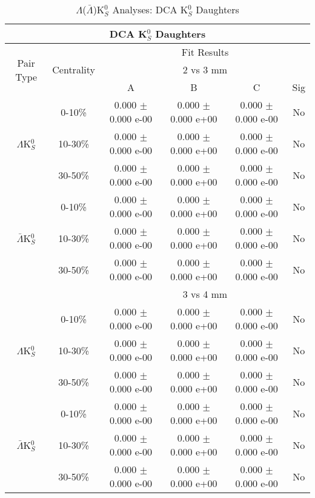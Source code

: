 \documentclass[../AnalysisNoteJBuxton.tex]{subfiles}
\begin{document}
\begin{table}
 \centering
 \begin{tabular}{|c|c|c|c|c|c|}
  \multicolumn{6}{c}{DCA K$^{0}_{S}$ Daughters} \\
  \hline
  \multirow{3}{*}{Pair Type} & \multirow{3}{*}{Centrality} & \multicolumn{4}{c|}{Fit Results} \\
  \cline{3-6}
   & & \multicolumn{4}{c|}{2 vs 3 mm} \\
  \cline{3-6}
   & & A & B & C & Sig \\
  \hline  
  \multirow{3}{*}{$\Lambda$K$^{0}_{S}$}
   &  0-10\% & 0.000 $\pm$ 0.000 e-00 & 0.000 $\pm$ 0.000 e+00 & 0.000 $\pm$ 0.000 e-00 & No \\
   & 10-30\% & 0.000 $\pm$ 0.000 e-00 & 0.000 $\pm$ 0.000 e+00 & 0.000 $\pm$ 0.000 e-00 & No \\
   & 30-50\% & 0.000 $\pm$ 0.000 e-00 & 0.000 $\pm$ 0.000 e+00 & 0.000 $\pm$ 0.000 e-00 & No \\
  \hline
  \multirow{3}{*}{$\bar{\Lambda}$K$^{0}_{S}$}  
   &  0-10\% & 0.000 $\pm$ 0.000 e-00 & 0.000 $\pm$ 0.000 e+00 & 0.000 $\pm$ 0.000 e-00 & No \\
   & 10-30\% & 0.000 $\pm$ 0.000 e-00 & 0.000 $\pm$ 0.000 e+00 & 0.000 $\pm$ 0.000 e-00 & No \\
   & 30-50\% & 0.000 $\pm$ 0.000 e-00 & 0.000 $\pm$ 0.000 e+00 & 0.000 $\pm$ 0.000 e-00 & No \\
  \hline 
  \multicolumn{2}{|c|}{} & \multicolumn{4}{c|}{3 vs 4 mm} \\
  \hline  
  \multirow{3}{*}{$\Lambda$K$^{0}_{S}$}   
   &  0-10\% & 0.000 $\pm$ 0.000 e-00 & 0.000 $\pm$ 0.000 e+00 & 0.000 $\pm$ 0.000 e-00 & No \\
   & 10-30\% & 0.000 $\pm$ 0.000 e-00 & 0.000 $\pm$ 0.000 e+00 & 0.000 $\pm$ 0.000 e-00 & No \\
   & 30-50\% & 0.000 $\pm$ 0.000 e-00 & 0.000 $\pm$ 0.000 e+00 & 0.000 $\pm$ 0.000 e-00 & No \\
  \hline  
  \multirow{3}{*}{$\bar{\Lambda}$K$^{0}_{S}$}
   &  0-10\% & 0.000 $\pm$ 0.000 e-00 & 0.000 $\pm$ 0.000 e+00 & 0.000 $\pm$ 0.000 e-00 & No \\
   & 10-30\% & 0.000 $\pm$ 0.000 e-00 & 0.000 $\pm$ 0.000 e+00 & 0.000 $\pm$ 0.000 e-00 & No \\
   & 30-50\% & 0.000 $\pm$ 0.000 e-00 & 0.000 $\pm$ 0.000 e+00 & 0.000 $\pm$ 0.000 e-00 & No \\
  \hline
 \end{tabular}
 \caption{$\Lambda$($\bar{\Lambda}$)K$^{0}_{S}$ Analyses: DCA K$^{0}_{S}$ Daughters}
 \label{tab:K0DaughtersDcaLamK0Full}
\end{table}
\end{document}
